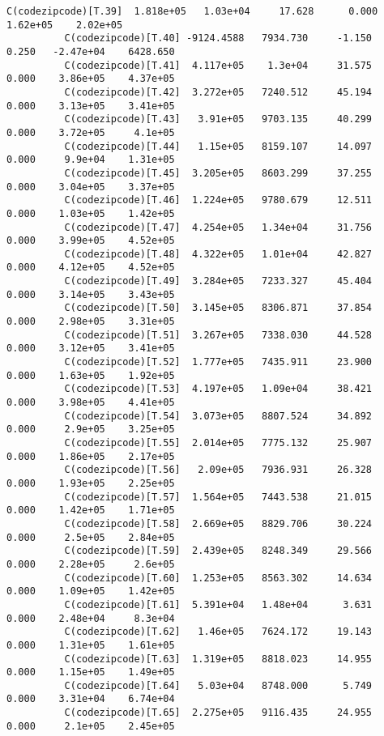 \documentclass[11pt]{article}
\begin{document}
\begin{Verbatim}[commandchars=\\\{\}]
          C(codezipcode)[T.39]  1.818e+05   1.03e+04     17.628      0.000    1.62e+05    2.02e+05
          C(codezipcode)[T.40] -9124.4588   7934.730     -1.150      0.250   -2.47e+04    6428.650
          C(codezipcode)[T.41]  4.117e+05    1.3e+04     31.575      0.000    3.86e+05    4.37e+05
          C(codezipcode)[T.42]  3.272e+05   7240.512     45.194      0.000    3.13e+05    3.41e+05
          C(codezipcode)[T.43]   3.91e+05   9703.135     40.299      0.000    3.72e+05     4.1e+05
          C(codezipcode)[T.44]   1.15e+05   8159.107     14.097      0.000     9.9e+04    1.31e+05
          C(codezipcode)[T.45]  3.205e+05   8603.299     37.255      0.000    3.04e+05    3.37e+05
          C(codezipcode)[T.46]  1.224e+05   9780.679     12.511      0.000    1.03e+05    1.42e+05
          C(codezipcode)[T.47]  4.254e+05   1.34e+04     31.756      0.000    3.99e+05    4.52e+05
          C(codezipcode)[T.48]  4.322e+05   1.01e+04     42.827      0.000    4.12e+05    4.52e+05
          C(codezipcode)[T.49]  3.284e+05   7233.327     45.404      0.000    3.14e+05    3.43e+05
          C(codezipcode)[T.50]  3.145e+05   8306.871     37.854      0.000    2.98e+05    3.31e+05
          C(codezipcode)[T.51]  3.267e+05   7338.030     44.528      0.000    3.12e+05    3.41e+05
          C(codezipcode)[T.52]  1.777e+05   7435.911     23.900      0.000    1.63e+05    1.92e+05
          C(codezipcode)[T.53]  4.197e+05   1.09e+04     38.421      0.000    3.98e+05    4.41e+05
          C(codezipcode)[T.54]  3.073e+05   8807.524     34.892      0.000     2.9e+05    3.25e+05
          C(codezipcode)[T.55]  2.014e+05   7775.132     25.907      0.000    1.86e+05    2.17e+05
          C(codezipcode)[T.56]   2.09e+05   7936.931     26.328      0.000    1.93e+05    2.25e+05
          C(codezipcode)[T.57]  1.564e+05   7443.538     21.015      0.000    1.42e+05    1.71e+05
          C(codezipcode)[T.58]  2.669e+05   8829.706     30.224      0.000     2.5e+05    2.84e+05
          C(codezipcode)[T.59]  2.439e+05   8248.349     29.566      0.000    2.28e+05     2.6e+05
          C(codezipcode)[T.60]  1.253e+05   8563.302     14.634      0.000    1.09e+05    1.42e+05
          C(codezipcode)[T.61]  5.391e+04   1.48e+04      3.631      0.000    2.48e+04     8.3e+04
          C(codezipcode)[T.62]   1.46e+05   7624.172     19.143      0.000    1.31e+05    1.61e+05
          C(codezipcode)[T.63]  1.319e+05   8818.023     14.955      0.000    1.15e+05    1.49e+05
          C(codezipcode)[T.64]   5.03e+04   8748.000      5.749      0.000    3.31e+04    6.74e+04
          C(codezipcode)[T.65]  2.275e+05   9116.435     24.955      0.000     2.1e+05    2.45e+05

\end{Verbatim}
\end{document}
